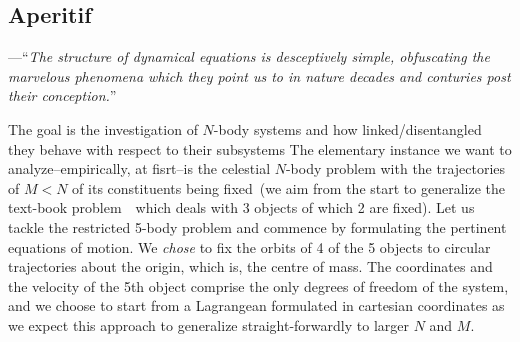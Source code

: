 \documentclass[]{article}
\newcommand{\tqt}[1]{\begin{flushleft}---\textquotedblleft\textit{#1}\textquotedblright\par\end{flushleft}}
\begin{document}
\begin{paracol}{2}

\subsection*{\small Aperitif}

\tqt{The structure of dynamical equations is desceptively simple, obfuscating the marvelous phenomena
which they point us to in nature decades and conturies post their conception.}

\begin{tasks}
    \task The goal is the investigation of $N$-body systems and how linked/disentangled they behave with respect to
    their subsystems
    \task The elementary instance we want to analyze--empirically, at fisrt--is the celestial $N$-body
    problem with the trajectories of $M<N$ of its constituents being fixed~(we aim from the start to
    generalize the text-book problem~\cite{Schmid1990,Geiges_2016}~which deals with 3 objects of which 2 are fixed).
    \task Let us tackle the restricted 5-body problem and commence by formulating the pertinent equations of motion.
    We \emph{chose} to fix the orbits of 4 of the 5 objects to circular trajectories about the origin, which is,
    the centre of mass.
    \task The coordinates and the velocity of the 5th object comprise the only degrees of freedom of the system,
    and we choose to start from a Lagrangean formulated in cartesian coordinates as we expect this approach to
    generalize straight-forwardly to larger $N$ and $M$.
\end{tasks}

\switchcolumn

\begin{tasks}
    \task
\end{tasks}
\end{paracol}
\end{document}
